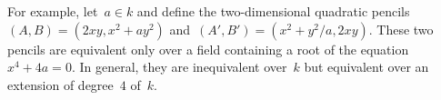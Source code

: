 \documentclass{amsart}
\begin{document}
% 

For example, let~$a ∈ k$ and define the two-dimensional
quadratic pencils~$(A,B) = (2 x y, x^2 + a y^2)$
and~$(A', B') = (x^2 + y^2/a, 2 x y)$.
These two pencils are equivalent only over a field
containing a root of the equation~$x^4 + 4 a = 0$.
In general, they are inequivalent over~$k$
but equivalent over an extension of degree~$4$ of~$k$.
\end{document}
